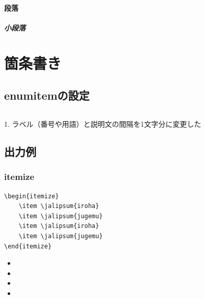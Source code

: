 \documentclass[article, head_space=25truemm, foot_space=15truemm, gutter=15truemm]{jlreq}
\begin{document}

\paragraph{段落}


\subparagraph{小段落}






\section{箇条書き}

\subsection{enumitemの設定}

\inputminted{latex}{./preamble/enumitem.tex}

\begin{markdown}
1. ラベル（番号や用語）と説明文の間隔を1文字分に変更した
\end{markdown}

\subsection{出力例}

\subsubsection{itemize}

\begin{verbatim}
\begin{itemize}
    \item \jalipsum{iroha}
    \item \jalipsum{jugemu}
    \item \jalipsum{iroha}
    \item \jalipsum{jugemu}
\end{itemize}
\end{verbatim}

\begin{itemize}
    \item {}
    \item {}
    \item {}
    \item {}
\end{itemize}
\end{document}

